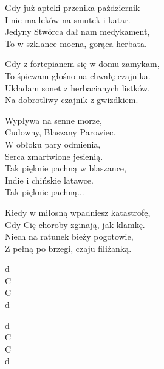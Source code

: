 \begin{text}
    Gdy już apteki przenika październik\\
    I nie ma leków na smutek i katar.\\
    Jedyny Stwórca dał nam medykament,\\
    To w szklance mocna, gorąca herbata.

    Gdy z fortepianem się w domu zamykam,\\
    To śpiewam głośno na chwałę czajnika.\\
    Układam sonet z herbacianych listków,\\
    Na dobrotliwy czajnik z gwizdkiem.

    \vin Wypływa na senne morze,\\
    \vin Cudowny, Blaszany Parowiec.\\
    \vin W obłoku pary odmienia,\\
    \vin Serca zmartwione jesienią.\\
    \vin Tak pięknie pachną w blaszance,\\
    \vin Indie i chińskie latawce.\\
    \vin Tak pięknie pachną...

    Kiedy w miłosną wpadniesz katastrofę,\\
    Gdy Cię choroby zginają, jak klamkę.\\
    Niech na ratunek bieży pogotowie,\\
    Z pełną po brzegi, czaju filiżanką.
\end{text}
\begin{chord}
    d\\
    C\\
    C\\
    d

    d\\
    C\\
    C\\
    d
\end{chord}